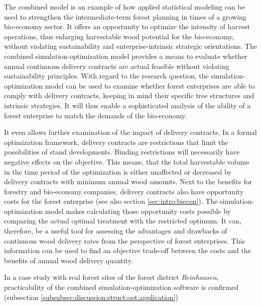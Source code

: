 The combined model is an example of how applied statistical modeling can be used to strengthen the intermediate-term forest planning in times of a growing bio-economy sector. It offers an opportunity to optimize the intensity of harvest operations, thus enlarging harvestable wood potential for the bio-economy, without violating sustainability and enterprise-intrinsic strategic orientations. The combined simulation-optimization model provides a means to evaluate whether annual continuous delivery contracts are actual feasible without violating sustainability principles. With regard to the research question, the simulation-optimization model can be used to examine whether forest enterprises are able to comply with delivery contracts, keeping in mind their specific tree structures and intrinsic strategies. It will thus enable a sophisticated analysis of the ability of a forest enterprise to match the demands of the bio-economy. 

It even allows further examination of the impact of delivery contracts. In a formal optimization framework, delivery contracts are restrictions that limit the possibilities of stand developments. Binding restrictions will necessarily have negative effects on the objective. This means, that the total harvestable volume in the time period of the optimization is either unaffected or decreased by delivery contracts with minimum annual wood amounts. Next to the benefits for forestry and bio-economy companies, delivery contracts also have opportunity costs for the forest enterprise (see also section \ref{sec:intro:biecon}). The simulation-optimization model makes calculating those opportunity costs possible by comparing the actual optimal treatment with the restricted optimum. It can, therefore, be a useful tool for assessing the advantages and drawbacks of continuous wood delivery rates from the perspective of forest enterprises. This information can be used to find an objective trade-off between the costs and the benefits of annual wood delivery quantity.

In a case study with real forest sites of the forest district \textit{Reinhausen}, practicability of the combined simulation-optimization software is confirmed (subsection \ref{subsubsec:discussion:struct:opt:application})